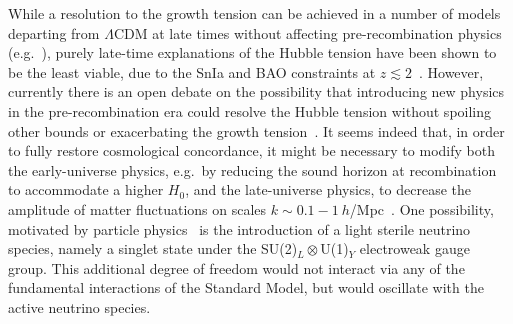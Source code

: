\documentclass[a4paper,11pt]{article}
\begin{document}
While a resolution to the growth tension can be achieved in a number of models departing from $\Lambda$CDM at late times without affecting pre-recombination physics (e.g.~\cite{Camera:2017tws,DiValentino:2017zyq,Lambiase:2018ows,Abellan:2020pmw,DiValentino:2020vvd}), purely late-time {explanations of} the Hubble tension have been shown to be the least viable, due to the SnIa and BAO constraints at $z \lesssim 2$~\cite{Bernal:2016gxb,Jedamzik:2020zmd}.
However, {currently there is an open debate on the possibility that} introducing new physics in the pre-recombination era could resolve the Hubble tension without spoiling other bounds or exacerbating the growth tension~\cite{Knox:2019rjx,Jedamzik:2020zmd,Haridasu:2020pms,DiValentino:2021izs,Vagnozzi:2021gjh}.
It seems indeed that, in order to fully restore cosmological concordance, it might be necessary to modify both the early-universe physics, e.g.\ by reducing the sound horizon at recombination to accommodate a higher $H_0$, and the late-universe physics, to decrease the amplitude of matter fluctuations on scales $k\sim 0.1-1 ~h$/Mpc~\cite{DiValentino:2021izs,Schoneberg:2021qvd}.
One possibility, motivated by particle physics~\cite{Abazajian:2012ys,Giunti:2019aiy} is the introduction of a light sterile neutrino species, namely a singlet state under the SU(2)$_L\otimes$U(1)$_Y$ electroweak gauge group.
This additional degree of freedom {would} not interact via any of the fundamental interactions of the Standard Model, {but would oscillate with the active neutrino species}. 
\end{document}
